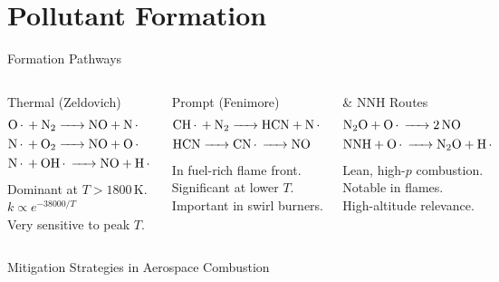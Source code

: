 \documentclass[aspectratio=169,10pt]{beamer}
\begin{document}
\section{Pollutant Formation}

\begin{frame}{ Formation Pathways}
  \begin{columns}[t]
    \begin{alertblock}{Thermal (Zeldovich)}
      \footnotesize
      \begin{align*}
        &\ce{O. + N2 -> NO + N.}\\
        &\ce{N. + O2 -> NO + O.}\\
        &\ce{N. + OH. -> NO + H.}
      \end{align*}
      Dominant at $T>1800\,\mathrm{K}$.\\
      $k\propto e^{-38000/T}$\\
      Very sensitive to peak $T$.
    \end{alertblock}
    \begin{block}{Prompt (Fenimore)}
      \footnotesize
      \begin{align*}
        &\ce{CH. + N2 -> HCN + N.}\\
        &\ce{HCN -> CN. -> NO}
      \end{align*}
      In fuel-rich flame front.\\
      Significant at lower $T$.\\
      Important in swirl burners.
    \end{block}
    \begin{exampleblock}{ \& NNH Routes}
      \footnotesize
      \begin{align*}
        &\ce{N2O + O. -> 2NO}\\
        &\ce{NNH + O. -> N2O + H.}
      \end{align*}
      Lean, high-$p$ combustion.\\
      Notable in  flames.\\
      High-altitude relevance.
    \end{exampleblock}
  \end{columns}
  \vspace{0.25cm}
  \begin{block}{Mitigation Strategies in Aerospace Combustion}

\end{block}
\end{frame}
\end{document}
